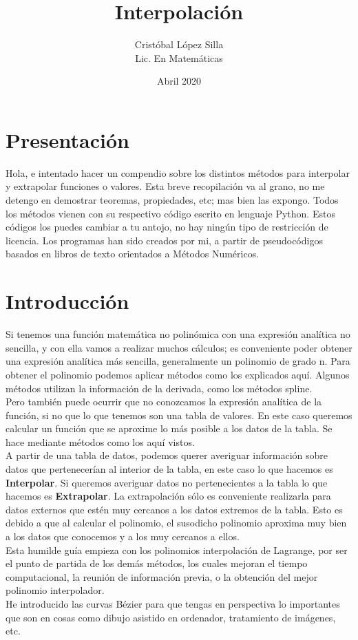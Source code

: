 \documentclass[12pt,a4paper,oneside]{scrbook}
\title{Interpolación}
\author{Cristóbal López Silla\\ Lic. En Matemáticas }
\date{Abril 2020}
\begin{document}
\maketitle
\tableofcontents
\clearpage

\section{Presentación}
Hola, e intentado hacer un compendio sobre los distintos métodos para interpolar y extrapolar funciones o valores. Esta breve recopilación va al grano, no me detengo en demostrar teoremas, propiedades, etc; mas bien las expongo. Todos los métodos vienen con su respectivo código escrito en lenguaje Python. Estos códigos los puedes cambiar a tu antojo, no hay ningún tipo de restricción de licencia. Los programas han sido creados por mi, a partir de pseudocódigos basados en libros de texto orientados a Métodos Numéricos.
\section{Introducción}
Si tenemos una función matemática no polinómica con una expresión analítica no sencilla, y con ella vamos a realizar muchos cálculos; es conveniente poder obtener una expresión analítica más sencilla, generalmente un polinomio de grado n. Para obtener el polinomio podemos aplicar métodos como los explicados aquí. Algunos métodos utilizan la información de la derivada, como los métodos spline.\\
Pero también puede ocurrir que no conozcamos la expresión analítica de la función, si no que lo que tenemos son una tabla de valores. En este caso queremos calcular un función que se aproxime lo más posible a los datos de la tabla. Se hace mediante métodos como los aquí vistos.\\
A partir de una tabla de datos, podemos querer averiguar información sobre datos que pertenecerían al interior de la tabla, en este caso lo que hacemos es \textbf{Interpolar}. Si queremos averiguar datos no pertenecientes a la tabla lo que hacemos es \textbf{Extrapolar}. La extrapolación sólo es conveniente realizarla para datos externos que estén muy cercanos a los datos extremos de la tabla. Esto es debido a que al calcular el polinomio, el susodicho polinomio aproxima muy bien a los datos que conocemos y a los muy cercanos a ellos.\\
Esta humilde guía empieza con los polinomios interpolación de Lagrange, por ser el punto de partida de los demás métodos, los cuales mejoran el tiempo computacional, la reunión de información previa, o la obtención del mejor polinomio interpolador.\\
He introducido las curvas Bézier para que tengas en perspectiva lo importantes que son en cosas como dibujo asistido en ordenador, tratamiento de imágenes, etc.
\end{document}
